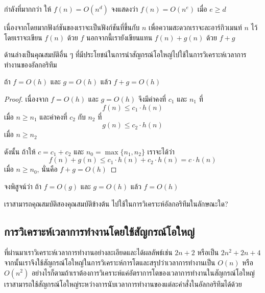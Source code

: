 \begin{quiz}{กำลัง{\wbr}ที่มา{\wbr}กก{\wbr}ว่า}
ให้ $f(n) = O(n^d)$ จง{\wbr}แสดง{\wbr}ว่า $f(n) = O(n^e)$ เมื่อ $e\geq d$
\end{quiz}

เนื่องจาก{\wbr}โดยมาก{\wbr}ฟังก์ชัน{\wbr}ของ{\wbr}เรา{\wbr}จะ{\wbr}เป็น{\wbr}ฟังก์ชัน{\wbr}ที่{\wbr}ขึ้น{\wbr}กับ $n$
เพื่อ{\wbr}ความ{\wbr}สะดวก{\wbr}เรา{\wbr}จะ{\wbr}ละ{\wbr}อาร์กิวเมนท์ $n$ ไว้ โดย{\wbr}เรา{\wbr}จะ{\wbr}เขียน $f(n)$ ด้วย $f$
นอกจากนี้{\wbr}เรา{\wbr}ยัง{\wbr}เขียน{\wbr}แทน $f(n)+g(n)$ ด้วย $f+g$

ด้าน{\wbr}ล่าง{\wbr}เป็นคุณ{\wbr}สมบัติ{\wbr}อื่น ๆ
ที่{\wbr}มี{\wbr}ประโยชน์{\wbr}ใน{\wbr}การ{\wbr}นำ{\wbr}สัญกรณ์{\wbr}โอ{\wbr}ใหญ่{\wbr}ไป{\wbr}ใช้{\wbr}ใน{\wbr}การ{\wbr}วิเคราะห์{\wbr}เวลา{\wbr}การ{\wbr}ทำงาน{\wbr}ของ{\wbr}อัล{\wbr}กอ{\wbr}ริ{\wbr}ทึม{\wbr}

\begin{theorem}
ถ้า $f=O(h)$ และ $g=O(h)$ แล้ว $f+g = O(h)$
\end{theorem}
\begin{proof}
เนื่องจาก $f=O(h)$ และ $g=O(h)$ จึง{\wbr}มี{\wbr}ค่าคงที่ $c_1$ และ $n_1$ ที่{\wbr}
\[ f(n) \leq c_1\cdot h(n)\] 
เมื่อ $n\geq n_1$ และ{\wbr}ค่าคงที่ $c_2$ กับ $n_2$ ที่ 
\[ g(n) \leq c_2\cdot h(n) \] 
เมื่อ $n\geq n_2$

ดังนั้น ถ้า{\wbr}ให้ $c=c_1+c_2$ และ $n_0=\max\{n_1,n_2\}$ เรา{\wbr}จะ{\wbr}ได้{\wbr}ว่า{\wbr}
\[
f(n) + g(n) \leq c_1\cdot h(n) + c_2\cdot h(n) = c\cdot h(n)
\]
เมื่อ $n\geq n_0$, นั่น{\wbr}คือ $f+g=O(h)$
\end{proof}

\begin{quiz}{}
จง{\wbr}พิสูจน์{\wbr}ว่า ถ้า $f=O(g)$ และ $g=O(h)$ แล้ว $f=O(h)$
\end{quiz}

\begin{quiz}{}
เรา{\wbr}สามารถ{\wbr}คุณสมบัติ{\wbr}สอง{\wbr}คุณสมบัติ{\wbr}ข้างต้น ไป{\wbr}ใช้{\wbr}ใน{\wbr}การ{\wbr}วิเคราะห์{\wbr}อัล{\wbr}กอ{\wbr}ริ{\wbr}ทึม{\wbr}ใน{\wbr}ลักษณะ{\wbr}ใด?
\end{quiz}

\subsection{การ{\wbr}วิเคราะห์{\wbr}เวลา{\wbr}การ{\wbr}ทำงาน{\wbr}โดย{\wbr}ใช้{\wbr}สัญกรณ์{\wbr}โอ{\wbr}ใหญ่}

ที่{\wbr}ผ่าน{\wbr}มา{\wbr}เรา{\wbr}วิเคราะห์{\wbr}เวลา{\wbr}การ{\wbr}ทำงาน{\wbr}อย่าง{\wbr}ละเอียด{\wbr}และ{\wbr}ได้{\wbr}ผลลัพธ์{\wbr}เช่น $2n+2$ หรือ{\wbr}เป็น{\wbr}
$2n^2 + 2n + 4$
จากนั้น{\wbr}เรา{\wbr}จึง{\wbr}ใช้{\wbr}สัญกรณ์{\wbr}โอ{\wbr}ใหญ่{\wbr}ใน{\wbr}การ{\wbr}วิเคราะห์{\wbr}การ{\wbr}โต{\wbr}และ{\wbr}สรุป{\wbr}ว่า{\wbr}เวลา{\wbr}การ{\wbr}ทำงาน{\wbr}เป็น $O(n)$
หรือ $O(n^2)$
อย่างไรก็ตาม{\wbr}ถ้า{\wbr}เรา{\wbr}ต้องการ{\wbr}วิเคราะห์{\wbr}แค่{\wbr}อัตรา{\wbr}การ{\wbr}โต{\wbr}ของ{\wbr}เวลา{\wbr}การ{\wbr}ทำงาน{\wbr}ใน{\wbr}สัญกรณ์{\wbr}โอ{\wbr}ใหญ่{\wbr}
เรา{\wbr}สามารถ{\wbr}ใช้{\wbr}สัญกรณ์{\wbr}โอ{\wbr}ใหญ่{\wbr}ระหว่าง{\wbr}การ{\wbr}นับ{\wbr}เวลา{\wbr}การ{\wbr}ทำงาน{\wbr}ของ{\wbr}แต่ละ{\wbr}คำสั่ง{\wbr}ใน{\wbr}อัล{\wbr}กอ{\wbr}ริ{\wbr}ทึม{\wbr}ได้{\wbr}ด้วย{\wbr}


